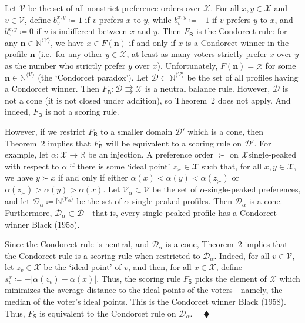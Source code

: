 \documentclass[
]{article}
\begin{document}
Let \(\mathcal{V}\) be the set of all nonstrict preference orders over
\(\mathcal{X}\). For all \(x,y \in \mathcal{X}\) and
\(v \in \mathcal{V}\), define \(b_{v}^{x,y} ≔ 1\) if \(v\) prefers \(x\)
to \(y\), while \(b_{v}^{x,y} ≔ - 1\) if \(v\) prefers \(y\) to \(x\),
and \(b_{v}^{x,y} ≔ 0\) if \(v\) is indifferent between \(x\) and \(y\).
Then \(F_{\mathsf{B}}\) is the Condorcet rule: for any
\(\mathbf{n} \in \mathbb{N}^{\langle\mathcal{V}\rangle}\), we have
\(x \in F\left( \mathbf{n} \right)\) if and only if \(x\) is a Condorcet
winner in the profile \(\mathbf{n}\) (i.e.~for any other
\(y \in \mathcal{X}\), at least as many voters strictly prefer \(x\)
over \(y\) as the number who strictly prefer \(y\) over \(x\)).
Unfortunately, \(F\left( \mathbf{n} \right) = \varnothing\)
for some \(\mathbf{n} \in \mathbb{N}^{\langle\mathcal{V}\rangle}\) (the
`Condorcet paradox'). Let
\(\mathcal{D} \subset \mathbb{N}^{\langle\mathcal{V}\rangle}\) be the
set of all profiles having a Condorcet winner. Then
\(\left. F_{\mathsf{B}}:\mathcal{D}\rightrightarrows\mathcal{X} \right.\)
is a neutral balance rule. However, \(\mathcal{D}\) is not a cone (it is
not closed under addition), so Theorem~2 does not apply. And indeed,
\(F_{\mathsf{B}}\) is not a scoring rule.

However, if we restrict \(F_{\mathsf{B}}\) to a smaller domain
\(\mathcal{D}'\) which is a cone, then Theorem~2 implies that
\(F_{\mathsf{B}}\) will be equivalent to a scoring rule on
\(\mathcal{D}'\). For example, let
\(\left. \alpha:\mathcal{X}\longrightarrow\mathbb{R} \right.\) be an
injection. A preference order \(\succ\) on \(\mathcal{X}\)single-peaked
with respect to \(\alpha\) if there is some `ideal point'
\(z_{\succ} \in \mathcal{X}\) such that, for all
\(x,y \in \mathcal{X}\), we have \(y \succ x\) if and only if either
\(\alpha(x) < \alpha(y) < \alpha\left( z_{\succ} \right)\) or
\(\alpha\left( z_{\succ} \right) > \alpha(y) > \alpha(x)\). Let
\(\mathcal{V}_{\alpha} \subset \mathcal{V}\) be the set of
\(\alpha\)-single-peaked preferences, and let
\(\mathcal{D}_{\alpha} ≔ \mathbb{N}^{\langle\mathcal{V}_{\alpha}\rangle}\)
be the set of \(\alpha\)-single-peaked profiles. Then
\(\mathcal{D}_{\alpha}\) is a cone. Furthermore,
\(\mathcal{D}_{\alpha} \subset \mathcal{D}\)---that is, every
single-peaked profile has a Condorcet winner Black (1958).

Since the Condorcet rule is neutral, and \(\mathcal{D}_{\alpha}\) is a
cone, Theorem~2 implies that the Condorcet rule is a scoring rule when
restricted to \(\mathcal{D}_{\alpha}\). Indeed, for all
\(v \in \mathcal{V}\), let \(z_{v} \in \mathcal{X}\) be the `ideal
point' of \(v\), and then, for all \(x \in \mathcal{X}\), define
\(s_{v}^{x} ≔ - \left| \alpha\left( z_{v} \right) - \alpha(x) \right|\).
Thus, the scoring rule \(F_{\mathsf{S}}\) picks the element of
\(\mathcal{X}\) which minimizes the average distance to the ideal points
of the voters---namely, the median of the voter's ideal points. This is
the Condorcet winner Black (1958). Thus, \(F_{\mathsf{S}}\) is
equivalent to the Condorcet rule on \(\mathcal{D}_{\alpha}\).
\(\quad ♦\)
\end{document}
